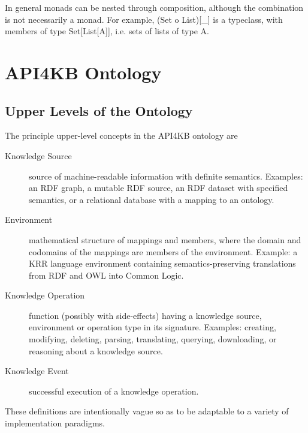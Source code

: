 \documentclass[runningheads]{llncs}
\begin{document}
In general monads can be nested through composition, although the combination is not necessarily a monad. For example, (Set o List)[\_] is a typeclass, with members of type Set[List[A]], i.e. sets of lists of type A.











\section{API4KB Ontology}
\label{sec:ontology}
\subsection{Upper Levels of the Ontology}
\label{sec:upper}
The principle upper-level concepts in the API4KB ontology are
\begin{description}
\item[Knowledge Source] source of machine-readable information with definite semantics. Examples: an RDF graph, a mutable RDF source, an RDF dataset with specified semantics, or a relational database with a mapping to an ontology.
\item[Environment] mathematical structure of mappings and members, where the domain and codomains of the mappings are members of the environment.  Example: a KRR language environment containing semantics-preserving translations from RDF and OWL into Common Logic.
\item[Knowledge Operation] function (possibly with side-effects) having a knowledge source, environment or operation type in its signature. Examples: creating, modifying, deleting, parsing, translating, querying, downloading, or reasoning about a knowledge source.
\item[Knowledge Event] successful execution of a knowledge operation.
\end{description}
These definitions are intentionally vague so as to be adaptable to a variety of implementation paradigms.
\end{document}
